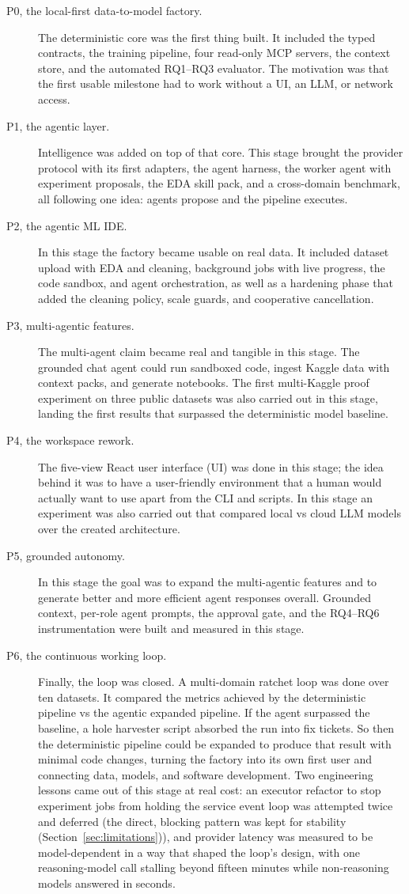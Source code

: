 \begin{description}
	\item[P0, the local-first data-to-model factory.] The deterministic core was the first thing built. It included the typed contracts, the training pipeline, four read-only MCP servers, the context store, and the automated RQ1--RQ3 evaluator. The motivation was that the first usable milestone had to work without a UI, an LLM, or network access.
	\item[P1, the agentic layer.] Intelligence was added on top of that core. This stage brought the provider protocol with its first adapters, the agent harness, the worker agent with experiment proposals, the EDA skill pack, and a cross-domain benchmark, all following one idea: agents propose and the pipeline executes.
	\item[P2, the agentic ML IDE.] In this stage the factory became usable on real data. It included dataset upload with EDA and cleaning, background jobs with live progress, the code sandbox, and agent orchestration, as well as a hardening phase that added the cleaning policy, scale guards, and cooperative cancellation.
	\item[P3, multi-agentic features.] The multi-agent claim became real and tangible in this stage. The grounded chat agent could run sandboxed code, ingest Kaggle data with context packs, and generate notebooks. The first multi-Kaggle proof experiment on three public datasets was also carried out in this stage, landing the first results that surpassed the deterministic model baseline.
	\item[P4, the workspace rework.] The five-view React user interface (UI) was done in this stage; the idea behind it was to have a user-friendly environment that a human would actually want to use apart from the CLI and scripts. In this stage an experiment was also carried out that compared local vs cloud LLM models over the created architecture.
	\item[P5, grounded autonomy.] In this stage the goal was to expand the multi-agentic features and to generate better and more efficient agent responses overall. Grounded context, per-role agent prompts, the approval gate, and the RQ4--RQ6 instrumentation were built and measured in this stage.
	\item[P6, the continuous working loop.] Finally, the loop was closed. A multi-domain ratchet loop was done over ten datasets. It compared the metrics achieved by the deterministic pipeline vs the agentic expanded pipeline. If the agent surpassed the baseline, a hole harvester script absorbed the run into fix tickets. So then the deterministic pipeline could be expanded to produce that result with minimal code changes, turning the factory into its own first user and connecting data, models, and software development. Two engineering lessons came out of this stage at real cost: an executor refactor to stop experiment jobs from holding the service event loop was attempted twice and deferred (the direct, blocking pattern was kept for stability (Section~\ref{sec:limitations})), and provider latency was measured to be model-dependent in a way that shaped the loop's design, with one reasoning-model call stalling beyond fifteen minutes while non-reasoning models answered in seconds.
\end{description}


